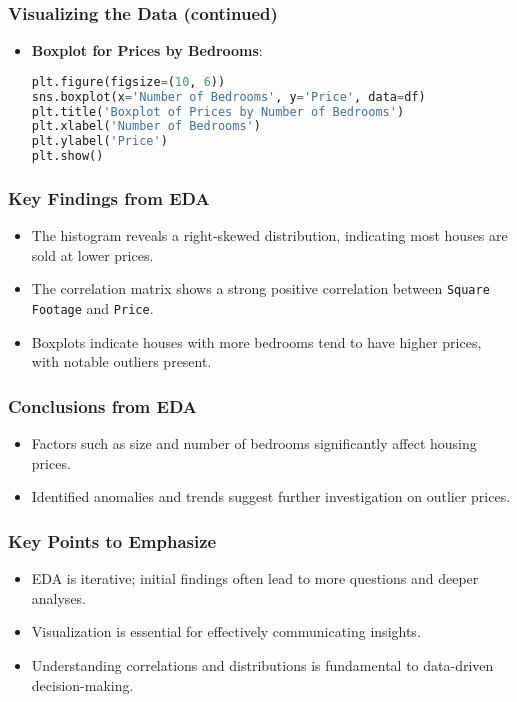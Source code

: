 \documentclass{beamer}
\begin{document}
\begin{frame}[fragile]
    \frametitle{Visualizing the Data (continued)}
    \begin{itemize}
        \item \textbf{Boxplot for Prices by Bedrooms}:
        \begin{lstlisting}[language=Python]
plt.figure(figsize=(10, 6))
sns.boxplot(x='Number of Bedrooms', y='Price', data=df)
plt.title('Boxplot of Prices by Number of Bedrooms')
plt.xlabel('Number of Bedrooms')
plt.ylabel('Price')
plt.show()
        \end{lstlisting}
    \end{itemize}
\end{frame}

\begin{frame}
    \frametitle{Key Findings from EDA}
    \begin{itemize}
        \item The histogram reveals a right-skewed distribution, indicating most houses are sold at lower prices.
        \item The correlation matrix shows a strong positive correlation between \texttt{Square Footage} and \texttt{Price}.
        \item Boxplots indicate houses with more bedrooms tend to have higher prices, with notable outliers present.
    \end{itemize}
\end{frame}

\begin{frame}
    \frametitle{Conclusions from EDA}
    \begin{itemize}
        \item Factors such as size and number of bedrooms significantly affect housing prices.
        \item Identified anomalies and trends suggest further investigation on outlier prices.
    \end{itemize}
\end{frame}

\begin{frame}
    \frametitle{Key Points to Emphasize}
    \begin{itemize}
        \item EDA is iterative; initial findings often lead to more questions and deeper analyses.
        \item Visualization is essential for effectively communicating insights.
        \item Understanding correlations and distributions is fundamental to data-driven decision-making.
    \end{itemize}
\end{frame}
\end{document}
